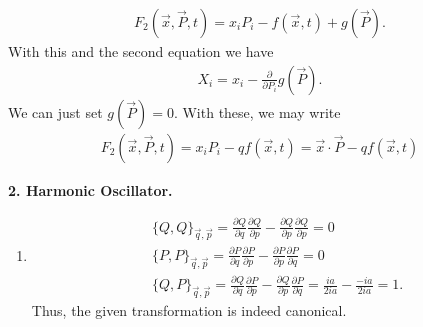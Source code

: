 \documentclass{article}
\theoremstyle{definition}
\newcommand{\p}{\partial}
\newcommand{\f}[2]{\frac{#1}{#2}}
\begin{document}
\begin{enumerate}[label=(\alph*)]
	\begin{align*}
	F_2(\vec{x},\vec{P},t) = x_i P_i - f(\vec{x},t) + g(\vec{P}).
	\end{align*}
	With this and the second equation we have
	\begin{align*}
	X_i = x_i - \f{\p}{\p P_i}g(\vec{P}).
	\end{align*}
	We can just set $g(\vec{P}) = 0$. With these, we may write
	\begin{align*}
	\boxed{F_2(\vec{x}, \vec{P},t) = x_i P_i - qf(\vec{x},t) = \vec{x}\cdot \vec{P} - q f(\vec{x},t)}
	\end{align*} 
\end{enumerate}


\noindent \textbf{2. Harmonic Oscillator.} 


\begin{enumerate}[label=(\alph*)]
	\item
	\begin{align*}
	&\{ Q, Q \}_{\vec{q},\vec{p}} = \f{\p Q}{\p q} \f{\p Q}{\p p} - \f{\p Q}{\p p} \f{\p Q}{\p p}= 0\\
	&\{ P, P \}_{\vec{q},\vec{p}} = \f{\p P}{\p q} \f{\p P}{\p p} - \f{\p P}{\p p} \f{\p P}{\p q} = 0\\
	&\{ Q, P \}_{\vec{q},\vec{p}} = \f{\p Q}{\p q} \f{\p P}{\p p} - \f{\p Q}{\p p} \f{\p P}{\p q} = \f{ia}{2ia} - \f{-ia}{2ia} = 1.
	\end{align*}
	Thus, the given transformation is indeed canonical. 
	

\end{enumerate}
\end{document}
